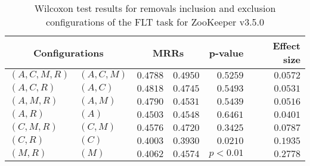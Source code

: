 
\begin{table}
\begin{spacing}{1.2}
\centering
\caption{Wilcoxon test results for removals inclusion and exclusion configurations of the FLT task for ZooKeeper v3.5.0}
\label{table:versus-wilcox-zookeeper-flt-removals}
\begin{tabular}{ll|rr|rr}
\toprule
      \multicolumn{2}{c|}{Configurations} &          \multicolumn{2}{c|}{MRRs} &       p-value & Effect size \\
\midrule
 $(A,C,M,R)$ &  $(A,C,M)$ & $0.4788$ & $0.4950$ & $0.5259$ &    $0.0572$ \\
   $(A,C,R)$ &    $(A,C)$ & $0.4818$ & $0.4745$ & $0.5493$ &    $0.0531$ \\
   $(A,M,R)$ &    $(A,M)$ & $0.4790$ & $0.4531$ & $0.5439$ &    $0.0516$ \\
     $(A,R)$ &      $(A)$ & $0.4503$ & $0.4548$ & $0.6461$ &    $0.0401$ \\
   $(C,M,R)$ &    $(C,M)$ & $0.4576$ & $0.4720$ & $0.3425$ &    $0.0787$ \\
     $(C,R)$ &      $(C)$ & $0.4003$ & $0.3930$ & $0.0210$ &    $0.1935$ \\
     $(M,R)$ &      $(M)$ & $0.4062$ & $0.4574$ & $p<0.01$ &    $0.2778$ \\
\bottomrule
\end{tabular}

\end{spacing}
\end{table}

